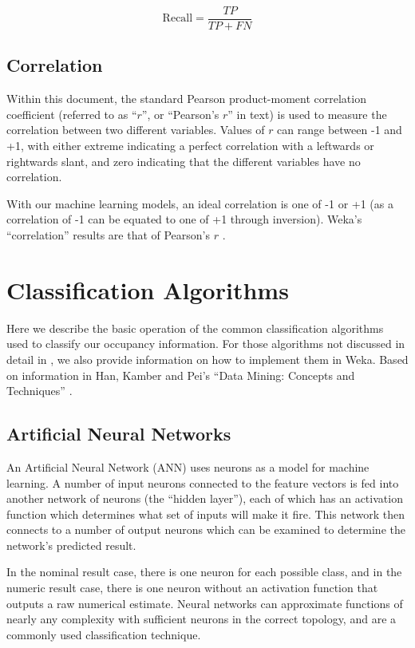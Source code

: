 \begin{equation}
\textrm{Recall} = \frac{TP}{TP + FN}
\end{equation}

\section{Correlation}
\label{sec:correlation}

Within this document, the standard Pearson product-moment correlation coefficient (referred to as ``$r$'', or ``Pearson's $r$'' in text) is used to measure the correlation between two different variables. Values of $r$ can range between -1 and +1, with either extreme indicating a perfect correlation with a leftwards or rightwards slant, and zero indicating that the different variables have no correlation.

With our machine learning models, an ideal correlation is one of -1 or +1 (as a correlation of -1 can be equated to one of +1 through inversion). Weka's ``correlation'' results are that of Pearson's $r$ \cite{WekaCorrelation}.

\chapter{Classification Algorithms}
\label{chap:appendix:classification}
Here we describe the basic operation of the common classification algorithms used to classify our occupancy information. For those algorithms not discussed in detail in , we also provide information on how to implement them in Weka. Based on information in Han, Kamber and Pei's ``Data Mining: Concepts and Techniques'' \cite{han2011data}.

\section{Artificial Neural Networks}
An Artificial Neural Network (ANN) uses neurons as a model for machine learning. A number of input neurons connected to the feature vectors is fed into another network of neurons (the ``hidden layer''), each of which has an activation function which determines what set of inputs will make it fire. This network then connects to a number of output neurons which can be examined to determine the network's predicted result.

In the nominal result case, there is one neuron for each possible class, and in the numeric result case, there is one neuron without an activation function that outputs a raw numerical estimate. Neural networks can approximate functions of nearly any complexity with sufficient neurons in the correct topology, and are a commonly used classification technique.

